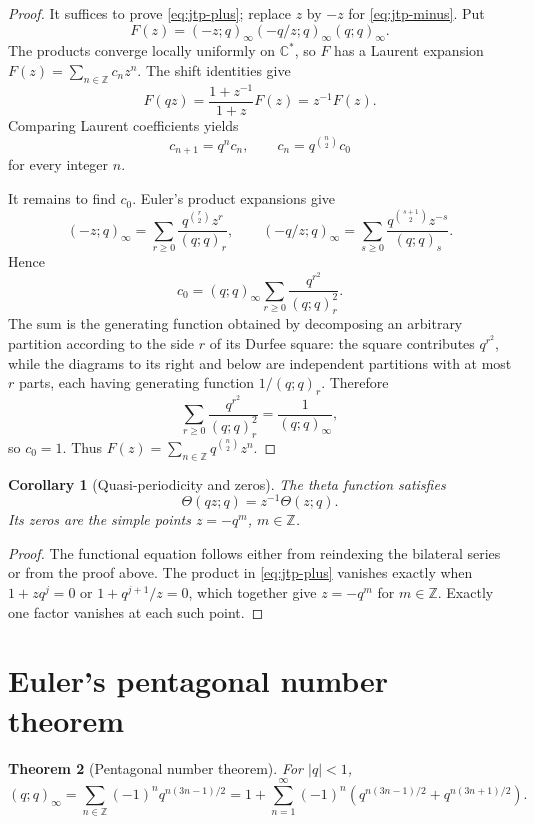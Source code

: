 \documentclass[11pt,oneside,openany]{book}
\newtheorem{theorem}{Theorem}[chapter]
\newtheorem{corollary}[theorem]{Corollary}
\theoremstyle{definition}
\theoremstyle{remark}
\newcommand{\C}{\mathbb C}
\newcommand{\Z}{\mathbb Z}
\newcommand{\abs}[1]{\lvert #1\rvert}
\begin{document}
\begin{proof}
It suffices to prove \eqref{eq:jtp-plus}; replace $z$ by $-z$ for \eqref{eq:jtp-minus}.  Put
\[
 F(z)=(-z;q)_\infty(-q/z;q)_\infty(q;q)_\infty.
\]
The products converge locally uniformly on $\C^*$, so $F$ has a Laurent expansion
\(
 F(z)=\sum_{n\in\Z}c_nz^n.
\)
The shift identities give
\[
 F(qz)=\frac{1+z^{-1}}{1+z}F(z)=z^{-1}F(z).
\]
Comparing Laurent coefficients yields
\[
 c_{n+1}=q^nc_n,
 \qquad
 c_n=q^{\binom n2}c_0
\]
for every integer $n$.

It remains to find $c_0$.  Euler's product expansions give
\[
 (-z;q)_\infty=\sum_{r\ge0}\frac{q^{\binom r2}z^r}{(q;q)_r},
 \qquad
 (-q/z;q)_\infty=\sum_{s\ge0}\frac{q^{\binom{s+1}{2}}z^{-s}}{(q;q)_s}.
\]
Hence
\[
 c_0=(q;q)_\infty\sum_{r\ge0}\frac{q^{r^2}}{(q;q)_r^2}.
\]
The sum is the generating function obtained by decomposing an arbitrary partition according to the side $r$ of its Durfee square: the square contributes $q^{r^2}$, while the diagrams to its right and below are independent partitions with at most $r$ parts, each having generating function $1/(q;q)_r$.  Therefore
\[
 \sum_{r\ge0}\frac{q^{r^2}}{(q;q)_r^2}
 =\frac1{(q;q)_\infty},
\]
so $c_0=1$.  Thus
\(
 F(z)=\sum_{n\in\Z}q^{\binom n2}z^n.
\)
\end{proof}

\begin{corollary}[Quasi-periodicity and zeros]\label{cor:theta-quasi}
The theta function satisfies
\[
 \Theta(qz;q)=z^{-1}\Theta(z;q).
\]
Its zeros are the simple points $z=-q^m$, $m\in\Z$.
\end{corollary}

\begin{proof}
The functional equation follows either from reindexing the bilateral series or from the proof above.  The product in \eqref{eq:jtp-plus} vanishes exactly when $1+zq^j=0$ or $1+q^{j+1}/z=0$, which together give $z=-q^m$ for $m\in\Z$.  Exactly one factor vanishes at each such point.
\end{proof}

\section{Euler's pentagonal number theorem}

\begin{theorem}[Pentagonal number theorem]\label{thm:pentagonal}
For $\abs q<1$,
\[
 (q;q)_\infty
 =\sum_{n\in\Z}(-1)^nq^{n(3n-1)/2}
 =1+\sum_{n=1}^{\infty}(-1)^n
 \left(q^{n(3n-1)/2}+q^{n(3n+1)/2}\right).
\]
\end{theorem}
\end{document}
